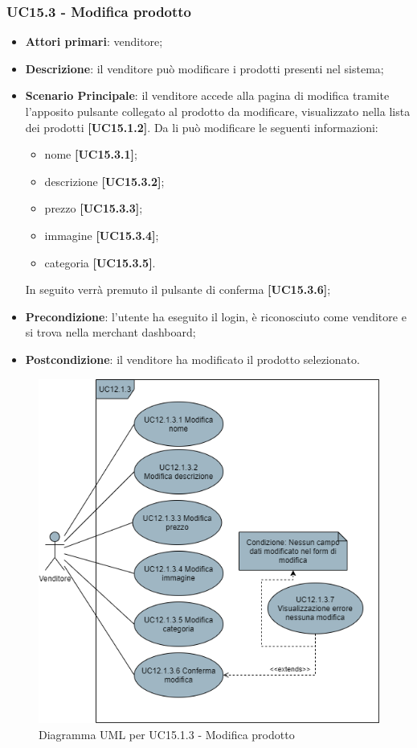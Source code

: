 \subsubsection{UC15.3 - Modifica prodotto}
\begin{itemize}
\item \textbf{Attori primari}: venditore;
\item \textbf{Descrizione}: il venditore può modificare i prodotti presenti nel sistema;
\item \textbf{Scenario Principale}: il venditore accede alla pagina di modifica tramite l'apposito pulsante collegato al prodotto da modificare, visualizzato nella lista dei prodotti \textbf{[UC15.1.2]}. Da li può modificare le seguenti informazioni:
\begin{itemize}
	\item nome \textbf{[UC15.3.1]};
	\item descrizione \textbf{[UC15.3.2]};
	\item prezzo \textbf{[UC15.3.3]};
	\item immagine \textbf{[UC15.3.4]};
	\item categoria \textbf{[UC15.3.5]}.
\end{itemize}
In seguito verrà premuto il pulsante di conferma \textbf{[UC15.3.6]};
\item \textbf{Precondizione}: l'utente ha eseguito il login, è riconosciuto come venditore e si trova nella merchant dashboard;
\item \textbf{Postcondizione}: il venditore ha modificato il prodotto selezionato.
\end{itemize}

\begin{figure}[H]
\centering
\includegraphics[scale=0.6]{res/UseCase/Immagini/ModificaProdotto}
\caption{Diagramma UML per UC15.1.3 - Modifica prodotto}
\end{figure}

